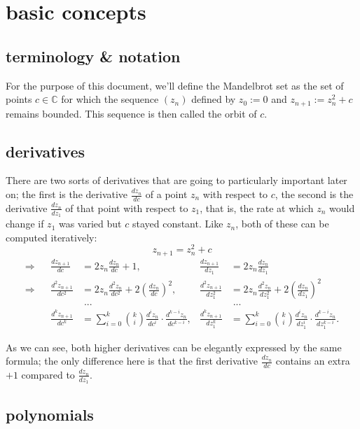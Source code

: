 \documentclass[12pt,a4paper]{article}
\begin{document}
\section{basic concepts}

\subsection{terminology \& notation}

For the purpose of this document, we'll define the Mandelbrot set as the set of points $c\in\mathbb C$ for which the sequence $(z_n)$ defined by $z_0:=0$ and $z_{n+1}:=z_n^2+c$ remains bounded. This sequence is then called the orbit of $c$.

\subsection{derivatives}

There are two sorts of derivatives that are going to particularly important later on; the first is the derivative $\frac{dz_n}{dc}$ of a point $z_n$ with respect to $c$, the second is the derivative $\frac{dz_n}{dz_1}$ of that point with respect to $z_1$, that is, the rate at which $z_n$ would change if $z_1$ was varied but $c$ stayed constant. Like $z_n$, both of these can be computed iteratively:
$$z_{n+1}=z_n^2+c$$
\begin{align*}
	\Rightarrow&&\frac{dz_{n+1}}{dc}&=2z_n\frac{dz_n}{dc}+1,&\frac{dz_{n+1}}{dz_1}&=2z_n\frac{dz_n}{dz_1}\\
	\Rightarrow&&\frac{d^2z_{n+1}}{dc^2}&=2z_n\frac{d^2z_n}{dc^2}+2\left(\frac{dz_n}{dc}\right)^2,&\frac{d^2z_{n+1}}{dz_1^2}&=2z_n\frac{d^2z_n}{dz_1^2}+2\left(\frac{dz_n}{dz_1}\right)^2\\
	&&&\;...&&\;...\\
	&&\frac{d^kz_{n+1}}{dc^k}&=\sum_{i=0}^k\binom ki\frac{d^iz_n}{dc^i}\cdot\frac{d^{k-i}z_n}{dc^{k-i}},&\frac{d^kz_{n+1}}{dz_1^k}&=\sum_{i=0}^k\binom ki\frac{d^iz_n}{dz_1^i}\cdot\frac{d^{k-i}z_n}{dz_1^{k-i}}.
\end{align*}

As we can see, both higher derivatives can be elegantly expressed by the same formula; the only difference here is that the first derivative $\frac{dz_n}{dc}$ contains an extra $+1$ compared to $\frac{dz_n}{dz_1}$.

\subsection{polynomials}
\end{document}
